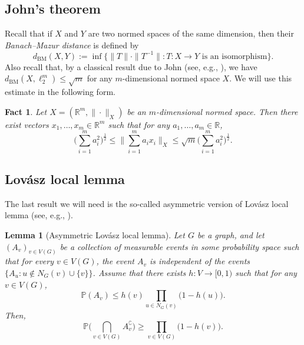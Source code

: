 \documentclass[11pt,leqno]{amsart}
\newtheorem{lemma}[theorem]{Lemma}
\newtheorem{fact}[theorem]{Fact}
\theoremstyle{remark}
\theoremstyle{plain}
\begin{document}
\subsection{John's theorem}

Recall that if $X$ and $Y$ are two normed spaces of the same dimension, then their \emph{Banach--Mazur distance} is defined by
\[ d_{\mathrm{BM}}(X,Y):= \inf\big\{ \|T\|\cdot\|T^{-1}\|\colon T\colon X\to Y \text{ is an isomorphism}\big\}. \]
Also recall that, by a classical result due to John (see, e.g., \cite{JL01}), we have
$d_{\mathrm{BM}}(X,\ell_2^m)\leqslant \sqrt{m}$ for any $m$-dimensional normed space $X$.
We will use this estimate in the following form.
\begin{fact} \label{lem:John_position}
Let $X=(\mathbb{R}^m,\|\cdot\|_X)$ be an $m$-dimensional normed space. Then there exist vectors
$x_1,\dots,x_m\in \mathbb{R}^m$ such that for any $a_1,\dots,a_m\in \mathbb{R}$,
\begin{equation} \label{eq2.5}
\Big(\sum_{i=1}^{m}a_i^2\Big)^\frac{1}{2} \leqslant
\Big\| \sum_{i=1}^{m}a_i x_i\Big\|_X \leqslant \sqrt{m} \Big(\sum_{i=1}^{m}a_i^2\Big)^\frac{1}{2}.
\end{equation}
\end{fact}

\subsection{Lov\'{a}sz local lemma}

The last result we will need is the so-called asymmetric version of Lov\'{a}sz local lemma (see, e.g., \cite[Lemma 5.1.1]{AS16}).

\begin{lemma}[Asymmetric Lov\'{a}sz local lemma] \label{lem:LLL}
Let $G$ be a graph, and let $(A_v)_{v\in V(G)}$ be a collection of measurable events in some probability space such that for every $v\in V(G)$, the event $A_v$ is independent of the events $\big\{A_u\colon u\not\in N_G(v)\cup\{v\}\big\}$. Assume that there exists $h\colon V\to [0,1)$ such that for any $v\in V(G)$,
\begin{equation} \label{eq2.6}
\mathbb{P}(A_v) \leqslant h(v) \prod_{u\in N_G(v)}\big(1-h(u)\big).
\end{equation}
Then,
\begin{equation} \label{eq2.7}
\mathbb{P}\Bigg( \bigcap_{v\in V(G)} A_v^{\complement} \Bigg) \geqslant \prod_{v\in V(G)} \big(1-h(v)\big).
\end{equation}
\end{lemma}
\end{document}
